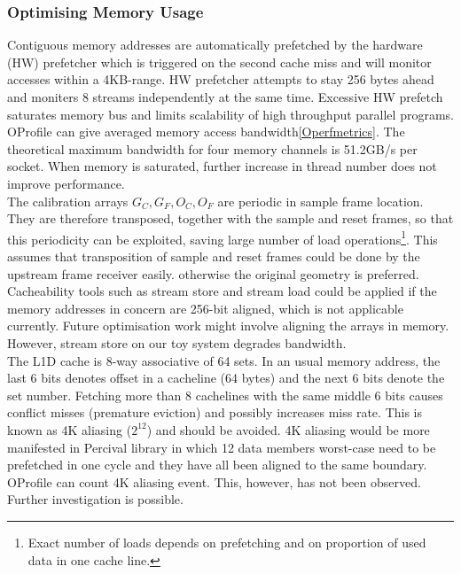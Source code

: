 \documentclass[journal]{IEEEtran}
\begin{document}
\subsubsection{Optimising Memory Usage}
\label{sec:memusage}
Contiguous memory addresses are automatically prefetched by the hardware (HW) prefetcher which is triggered on the second cache miss and will monitor accesses within a 4KB-range. HW prefetcher attempts to stay 256 bytes ahead and moniters 8 streams independently at the same time. Excessive HW prefetch saturates memory bus and limits scalability of high throughput parallel programs. OProfile can give averaged memory access bandwidth\ref{Operfmetrics}. The theoretical maximum bandwidth for four memory channels is 51.2GB/s per socket. When memory is saturated, further increase in thread number does not improve performance. \\
The calibration arrays $G_C, G_F, O_C, O_F$ are periodic in sample frame location. They are therefore transposed, together with the sample and reset frames, so that this periodicity can be exploited, saving large number of load operations\footnote{Exact number of loads depends on prefetching and on proportion of used data in one cache line.}. This assumes that transposition of sample and reset frames could be done by the upstream frame receiver easily. otherwise the original geometry is preferred. \\
Cacheability tools such as stream store and stream load \cite{themanual} could be applied if the memory addresses in concern are 256-bit aligned, which is not applicable currently. Future optimisation work might involve aligning the arrays in memory. However, stream store on our toy system degrades bandwidth. \\
The L1D cache is 8-way associative of 64 sets. In an usual memory address, the last 6 bits denotes offset in a cacheline (64 bytes) and the next 6 bits denote the set number. Fetching more than 8 cachelines with the same middle 6 bits causes conflict misses (premature eviction) and possibly increases miss rate. This is known as 4K aliasing ($2^{12}$) and should be avoided. 4K aliasing would be more manifested in Percival library in which 12 data members worst-case need to be prefetched in one cycle and they have all been aligned to the same boundary. OProfile can count 4K aliasing event. This, however, has not been observed. Further investigation is possible.
\end{document}
